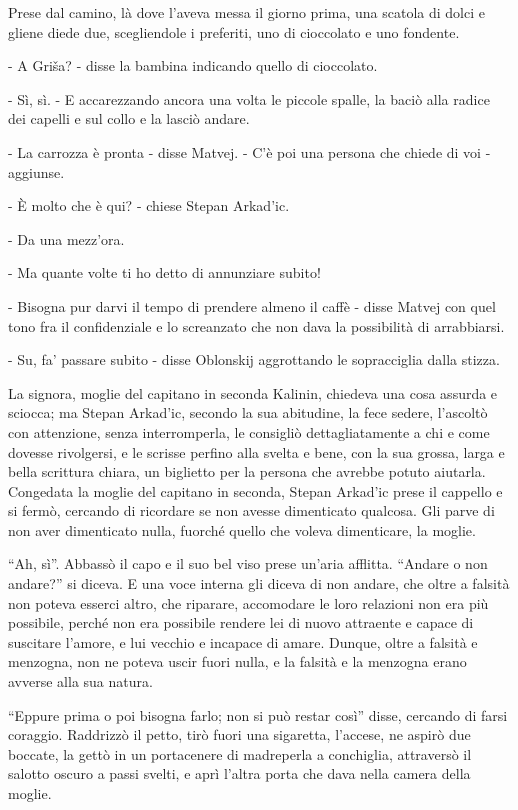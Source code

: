 Prese dal camino, là dove l'aveva messa il giorno prima, una scatola di dolci e gliene diede due, scegliendole i preferiti, uno di cioccolato e uno fondente. 

- A Griša? - disse la bambina indicando quello di cioccolato. 

- Sì, sì. - E accarezzando ancora una volta le piccole spalle, la baciò alla radice dei capelli e sul collo e la lasciò andare. 

- La carrozza è pronta - disse Matvej. - C'è poi una persona che chiede di voi - aggiunse. 

- È molto che è qui? - chiese Stepan Arkad'ic. 

- Da una mezz'ora. 

- Ma quante volte ti ho detto di annunziare subito! 

- Bisogna pur darvi il tempo di prendere almeno il caffè - disse Matvej con quel tono fra il confidenziale e lo screanzato che non dava la possibilità di arrabbiarsi. 

- Su, fa' passare subito - disse Oblonskij aggrottando le sopracciglia dalla stizza. 

La signora, moglie del capitano in seconda Kalinin, chiedeva una cosa assurda e sciocca; ma Stepan Arkad'ic, secondo la sua abitudine, la fece sedere, l'ascoltò con attenzione, senza interromperla, le consigliò dettagliatamente a chi e come dovesse rivolgersi, e le scrisse perfino alla svelta e bene, con la sua grossa, larga e bella scrittura chiara, un biglietto per la persona che avrebbe potuto aiutarla. Congedata la moglie del capitano in seconda, Stepan Arkad'ic prese il cappello e si fermò, cercando di ricordare se non avesse dimenticato qualcosa. Gli parve di non aver dimenticato nulla, fuorché quello che voleva dimenticare, la moglie. 

``Ah, sì''. Abbassò il capo e il suo bel viso prese un'aria afflitta. ``Andare o non andare?'' si diceva. E una voce interna gli diceva di non andare, che oltre a falsità non poteva esserci altro, che riparare, accomodare le loro relazioni non era più possibile, perché non era possibile rendere lei di nuovo attraente e capace di suscitare l'amore, e lui vecchio e incapace di amare. Dunque, oltre a falsità e menzogna, non ne poteva uscir fuori nulla, e la falsità e la menzogna erano avverse alla sua natura. 

``Eppure prima o poi bisogna farlo; non si può restar così'' disse, cercando di farsi coraggio. Raddrizzò il petto, tirò fuori una sigaretta, l'accese, ne aspirò due boccate, la gettò in un portacenere di madreperla a conchiglia, attraversò il salotto oscuro a passi svelti, e aprì l'altra porta che dava nella camera della moglie. 

